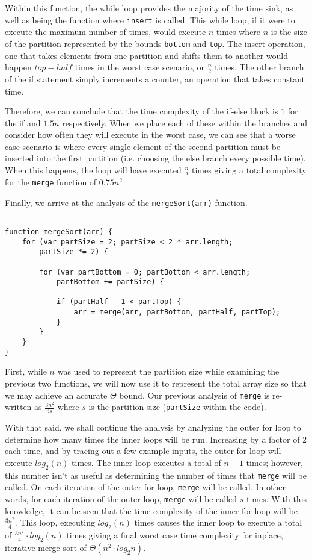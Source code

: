 \documentclass[12pt]{article}
\begin{document}
Within this function, the while loop provides the majority of the time sink, as well as being the function where \texttt{insert} is called. This while loop, if it were to execute the maximum number of times, would execute $n$ times where $n$ is the size of the partition represented by the bounds \texttt{bottom} and \texttt{top}. The insert operation, one that takes elements from one partition and shifts them to another would happen $top - half$ times in the worst case scenario, or $\frac{n}{2}$ times. The other branch of the if statement simply increments a counter, an operation that takes constant time.

Therefore, we can conclude that the time complexity of the if-else block is $1$ for the if and $1.5n$ respectively. When we place each of these within the branches and consider how often they will execute in the worst case, we can see that a worse case scenario is where every single element of the second partition must be inserted into the first partition (i.e. choosing the else branch every possible time). When this happens, the loop will have executed $\frac{n}{2}$ times giving a total complexity for the \texttt{merge} function of $0.75n^2$

Finally, we arrive at the analysis of the \texttt{mergeSort(arr)} function.

\begin{lstlisting}

function mergeSort(arr) {
    for (var partSize = 2; partSize < 2 * arr.length;
        partSize *= 2) {

        for (var partBottom = 0; partBottom < arr.length;
            partBottom += partSize) {

            if (partHalf - 1 < partTop) {
                arr = merge(arr, partBottom, partHalf, partTop);
            }
        }
    }
}
\end{lstlisting}

First, while $n$ was used to represent the partition size while examining the previous two functions, we will now use it to represent the total array size so that we may achieve an accurate $\Theta$ bound. Our previous analysis of \texttt{merge} is re-written as $\frac{3n^2}{4s}$ where $s$ is the partition size (\texttt{partSize} within the code).

With that said, we shall continue the analysis by analyzing the outer for loop to determine how many times the inner loops will be run. Increasing by a factor of 2 each time, and by tracing out a few example inputs, the outer for loop will execute $log_2(n)$ times. The inner loop executes a total of $n-1$ times; however, this number isn't as useful as determining the number of times that \texttt{merge} will be called. On each iteration of the outer for loop, \texttt{merge} will be called. In other words, for each iteration of the outer loop, \texttt{merge} will be called $s$ times. With this knowledge, it can be seen that the time complexity of the inner for loop will be $\frac{3n^2}{4}$. This loop, executing $log_2(n)$ times causes the inner loop to execute a total of $\frac{3n^2}{4} \cdot log_2(n)$ times giving a final worst case time complexity for inplace, iterative merge sort of $\Theta (n^2 \cdot log_2n)$. \\
\end{document}
